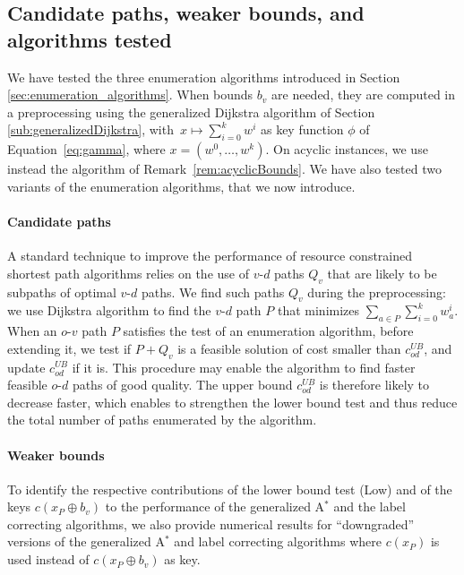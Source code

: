 \documentclass[11pt]{amsart}
\theoremstyle{plain}
\theoremstyle{remark}
\newcommand{\rplus}{\oplus}
\newcommand{\rcost}{c}
\newcommand{\re}{x}
\begin{document}
\subsection{Candidate paths, weaker bounds, and algorithms tested} \label{sub:candidate_paths}
 
We have tested the three enumeration algorithms introduced in Section \ref{sec:enumeration_algorithms}. When bounds $b_{v}$ are needed, they are computed in a preprocessing using the generalized Dijkstra algorithm of Section \ref{sub:generalizedDijkstra}, with~$\re \mapsto \sum_{i=0}^{k}w^{i}$ as key function $\phi$ of Equation~\eqref{eq:gamma}, where $\re = (w^{0},\ldots,w^{k})$. On acyclic instances, we use instead the algorithm of Remark~\ref{rem:acyclicBounds}.  We have also tested two variants of the enumeration algorithms, that we now introduce. 

 \paragraph{Candidate paths}
 A standard technique to improve the performance of resource constrained shortest path algorithms \citep{dumitrescu2003improved} relies on the use of $v$-$d$ paths $Q_{v}$ that are likely to be subpaths of optimal $v$-$d$ paths. We find such paths $Q_{v}$ during the preprocessing: we use Dijkstra algorithm to find the $v$-$d$ path $P$ that minimizes $\sum_{a\in P}\sum_{i=0}^{k}w_{a}^{i}$. When an $o$-$v$ path $P$ satisfies the test of an enumeration algorithm, before extending it, we test if $P + Q_{v}$ is a feasible solution of cost smaller than $c_{od}^{UB}$, and update $c_{od}^{UB}$ if it is. This procedure may enable the algorithm to find faster feasible $o$-$d$ paths of good quality. The upper bound $c_{od}^{UB}$ is therefore likely to decrease faster, which enables to strengthen the lower bound test and thus reduce the total number of paths enumerated by the algorithm. 

\paragraph{Weaker bounds} To identify the respective contributions of the lower bound test (Low) and of the keys $\rcost(\re_{P} \rplus b_{v})$ to the performance of the generalized A$^{*}$ and the label correcting algorithms, we also provide numerical results for ``downgraded'' versions of the generalized A$^{*}$ and label correcting algorithms where $c(\re_{P})$ is used instead of $c(\re_{P} \rplus b_{v})$ as key. 
\end{document}

